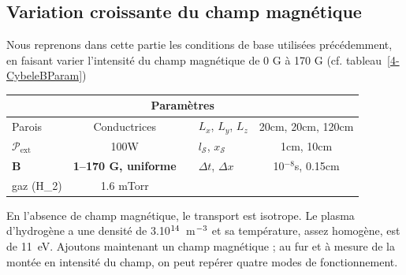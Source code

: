 \begin{refsection}
\subsection{Variation croissante du champ magnétique}
Nous reprenons dans cette partie les conditions de base utilisées précédemment,
en faisant varier l'intensité du champ magnétique de 0 G à 170 G (cf.
tableau~\ref{4-CybeleBParam})

\begin{minipage}{\textwidth}
\footnotesize\centering
{}
\begin{tabular}{lcclc}\toprule
\multicolumn{5}{c}{\bf Paramètres}\\
\midrule 
Parois & Conductrices &&$L_x$, $L_y$, $L_z$  & 20cm, 20cm,
120cm\\
$\mathcal{P}_\text{ext}$&100W&&$l_\mathcal{S}$, $x_\mathcal{S}$&1cm, 10cm\\
$\mathbf B$ &\textbf{1--170 G, uniforme}&&$\Delta t$, $\Delta x$&10$^{-8}$s,
0.15cm\\
gaz (H_2) & 1.6 mTorr&&&\\
\bottomrule
\end{tabular}
\label{4-CybeleBParam}
\end{minipage}	

En l'absence de champ magnétique, le transport est isotrope. Le plasma
d'hydrogène a une densité de 3.10$^{{14}}$~m$^{{-3}}$ et sa
température, assez homogène, est de 11~eV. Ajoutons maintenant un champ
magnétique ; au fur et à mesure de la montée en intensité du champ, on peut
repérer quatre modes de fonctionnement.


\end{refsection}
